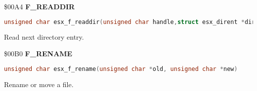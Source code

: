 \$00A4 \textbf{F\_READDIR}

\begin{lstlisting}[language=C]
unsigned char esx_f_readdir(unsigned char handle,struct esx_dirent *dirent)
\end{lstlisting}

Read next directory entry.

%
%

\$00B0 \textbf{F\_RENAME}

\begin{lstlisting}[language=C]
unsigned char esx_f_rename(unsigned char *old, unsigned char *new)
\end{lstlisting}

Rename or move a file.


